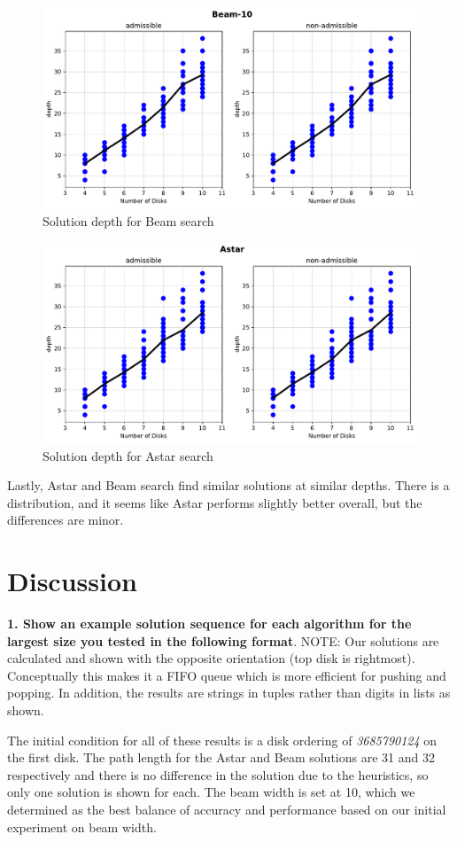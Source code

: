 \documentclass[12pt]{article}
\begin{document}
\begin{figure}[H]
	\centering
    \includegraphics[width=.8\textwidth]{FullDepthBeam-10}	
	\caption{Solution depth for Beam search}
	\label{f:FullBeamDepth}
\end{figure}
\begin{figure}[H]
	\centering
    \includegraphics[width=.8\textwidth]{FullDepthAstar}	
	\caption{Solution depth for Astar search}
	\label{f:FullADepth}
\end{figure}

Lastly, Astar and Beam search find similar solutions at similar depths.  
There is a distribution, and it seems like Astar performs slightly better overall, but the differences are minor.

\section{Discussion}

\textbf{1. Show an example solution sequence for each algorithm for the largest size you tested in the following format}.
NOTE: Our solutions are calculated and shown with the opposite orientation (top disk is rightmost).  
Conceptually this makes it a FIFO queue which is more efficient for pushing and popping.  
In addition, the results are strings in tuples rather than digits in lists as shown.

The initial condition for all of these results is a disk ordering of \textit{3685790124} on the first disk. 
The path length for the Astar and Beam solutions are 31 and 32 respectively and there is no difference in the solution due to the heuristics, so only one solution is shown for each.  
The beam width is set at 10, which we determined as the best balance of accuracy and performance based on our initial experiment on beam width.
\end{document}
